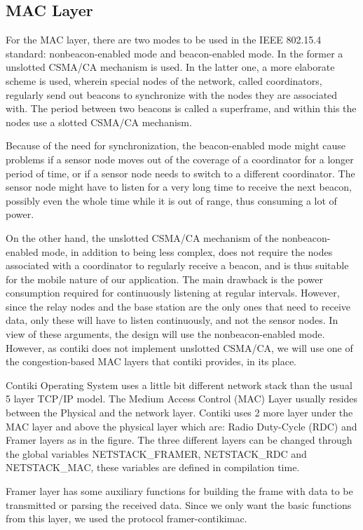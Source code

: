 \documentclass[conference]{IEEEtran}
\begin{document}
\subsection{MAC Layer}

For the MAC layer, there are two modes to be used in the IEEE 802.15.4
standard: nonbeacon-enabled mode and beacon-enabled mode. In the former
a unslotted CSMA/CA mechanism is used. In the latter one, a more elaborate
scheme is used, wherein special nodes of the network, called coordinators,
regularly send out beacons to synchronize with the nodes they are associated
with. The period between two beacons is called a superframe, and within this
the nodes use a slotted CSMA/CA mechanism.

Because of the need for synchronization, the beacon-enabled mode might cause
problems if a sensor node moves out of the coverage of a coordinator for
a longer period of time, or if a sensor node needs to switch to a different
coordinator.  The sensor node might have to listen for a very long time to
receive the next beacon, possibly even the whole time while it is out of range,
thus consuming a lot of power.

On the other hand, the unslotted CSMA/CA mechanism of the nonbeacon-enabled
mode, in addition to being less complex, does not require the nodes associated
with a coordinator to regularly receive a beacon, and is thus suitable for the
mobile nature of our application. The main drawback is the power consumption
required for continuously listening at regular intervals.  However, since the
relay nodes and the base station are the only ones that need to receive data,
only these will have to listen continuously, and not the sensor nodes. In view
of these arguments, the design will use the nonbeacon-enabled mode. However, as
contiki does not implement unslotted CSMA/CA, we will use one of the
congestion-based MAC layers that contiki provides, in its place.

Contiki Operating System uses a little bit different network stack than the usual 
5 layer TCP/IP model. The Medium Access Control (MAC) Layer usually resides between 
the Physical and the network layer. Contiki uses 2 more layer under the MAC layer and 
above the physical layer which are: Radio Duty-Cycle (RDC) and Framer layers as in 
the figure. The three different layers can be changed through the global variables 
NETSTACK\_FRAMER, NETSTACK\_RDC and NETSTACK\_MAC, these variables are defined in compilation time.

Framer layer has some auxiliary functions for building the frame with data to be transmitted or 
parsing the received data. Since we only want the basic functions from this layer, we used the 
protocol framer-contikimac.
\end{document}
